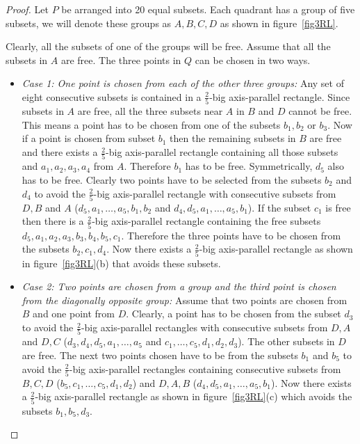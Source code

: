 \begin{proof}
Let $P$ be arranged into 20 equal subsets. Each quadrant has a group of five subsets, we will denote these groups as 
$A,B,C,D$ as shown in figure~\ref{fig3RL}.



Clearly, all the subsets of one of the groups will be free. Assume that all the subsets
in $A$ are free. The three points in $Q$ can be chosen in two ways.
\begin{itemize}
 \item \emph{Case 1: One point is chosen from each of the other three groups:}
Any set of eight consecutive subsets is contained in a $\frac{2}{5}$-big axis-parallel
rectangle. Since subsets in $A$ are free, all the three subsets near $A$ in $B$ and $D$
cannot be free. This means a point has to be chosen from one of the subsets
$b_1, b_2$ or $b_3$. Now if a
point is chosen from subset $b_1$ then the remaining subsets in $B$ are free and there exists
a $\frac{2}{5}$-big axis-parallel rectangle containing all those subsets and $a_1,a_2,a_3,a_4$ from $A$.
Therefore $b_1$ has to be free. Symmetrically, $d_5$ also has to be free. Clearly two points have to be selected from the subsets $b_2$ and $d_4$
to avoid the $\frac{2}{5}$-big axis-parallel
rectangle with consecutive subsets from $D,B$ and $A$ ($d_5,a_1,\dots,a_5,b_1,b_2$ and $d_4,d_5,a_1,\dots,a_5,b_1$). If the subset $c_1$ is free then there is a $\frac{2}{5}$-big axis-parallel rectangle containing the free subsets 
$d_5,a_1,a_2,a_3,b_3,b_4,b_5,c_1$.
 Therefore the three points have to be chosen from the subsets
$b_2,c_1,d_4$. Now there exists a $\frac{2}{5}$-big axis-parallel rectangle as shown in figure~\ref{fig3RL}(b) that avoids these subsets.
\item \emph{Case 2: Two points are chosen from a group and the third point is chosen
from the diagonally opposite group:}
Assume that two points are chosen from $B$
and one point from $D$. Clearly, a point has to be chosen from the subset $d_3$ to avoid the $\frac{2}{5}$-big
axis-parallel rectangles with consecutive subsets from $D,A$ and $D,C$ ($d_3,d_4,d_5,a_1,\dots,a_5$ and $c_1,\dots,c_5,d_1,d_2,d_3$).
 The other subsets in $D$ are free. The next two points
chosen have to be from the subsets $b_1$ and $b_5$ to avoid the $\frac{2}{5}$-big axis-parallel
rectangles containing consecutive subsets from $B,C,D$ ($b_5,c_1,\dots,c_5,d_1,d_2$) and $D,A,B$ ($d_4,d_5,a_1,\dots,a_5,b_1$). Now
there exists a $\frac{2}{5}$-big axis-parallel rectangle as shown in figure~\ref{fig3RL}(c)
which avoids the subsets $b_1,b_5,d_3$.
\end{itemize}

\end{proof}


